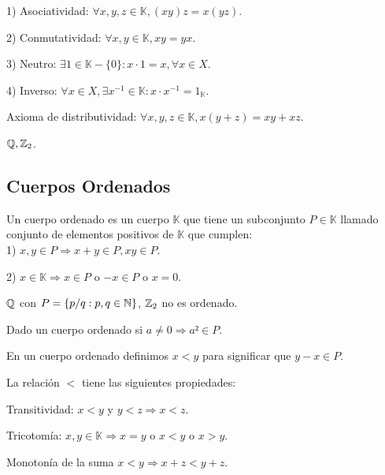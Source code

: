 1) Asociatividad: $\forall x,y,z \in \mathbb{K}, (xy)z=x(yz)$.

2) Conmutatividad: $\forall x,y \in \mathbb{K}, xy=yx$.

3) Neutro: $\exists 1 \in \mathbb{K}-\{0\} :x \cdot 1 = x, \forall x \in X$.

4) Inverso: $\forall x \in X, \exists x^{-1} \in \mathbb{K} : x \cdot x^{-1} = 1_\mathbb{K}$. 

Axioma de distributividad: $\forall x,y,z \in \mathbb{K}, x(y+z)=xy+xz$.

\begin{eg}
    $\mathbb{Q}, \mathbb{Z}_2$.
\end{eg} 

\subsection{Cuerpos Ordenados}

Un cuerpo ordenado es un cuerpo $\mathbb{K}$ que tiene un subconjunto $P \in \mathbb{K}$ llamado conjunto de elementos positivos de $\mathbb{K}$ que cumplen: \\

1) $x,y \in P \Rightarrow x+y \in P, xy \in P$.

2) $x \in \mathbb{K} \Rightarrow x \in P$ o $-x \in P$ o $x=0$. \\

\begin{eg}
    $\mathbb{Q}$ con $P = \{ p/q:p,q\in \mathbb{N} \}$, $\mathbb{Z}_2$ no es ordenado.
\end{eg}

\begin{prop}
    Dado un cuerpo ordenado si $a \neq 0 \Rightarrow a²\in P$.
\end{prop}

En un cuerpo ordenado definimos $x<y$ para significar que $y-x\in P$.

La relación $<$ tiene las siguientes propiedades:

\begin{prop}
    Transitividad: $x<y$ y $y<z \Rightarrow x<z$. 
\end{prop}

\begin{prop}
    Tricotomía: $x,y \in \mathbb{K} \Rightarrow x=y$ o $x<y$ o $x>y$.
\end{prop}

\begin{prop}
    Monotonía de la suma $x<y \Rightarrow x+z<y+z$.
\end{prop}

